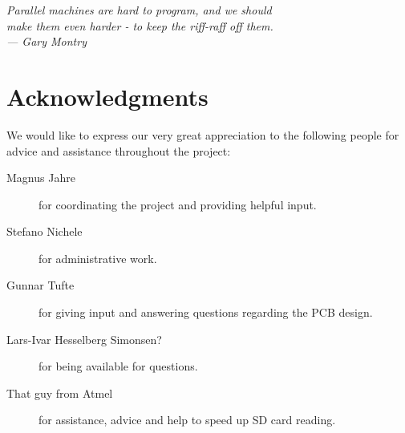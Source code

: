 
\begin{flushright}{\slshape
    Parallel machines are hard to program, and we should\\
    make them even harder - to keep the riff-raff off them.\\ \medskip
    ---  Gary Montry}  %
\end{flushright}

\bigskip

\begingroup
\let\clearpage\relax
\let\cleardoublepage\relax
\let\cleardoublepage\relax
\chapter*{Acknowledgments}
\bigskip

We would like to express our very great appreciation to the following people for
advice and assistance throughout the project:

\begin{description} %
\item[Magnus Jahre] for coordinating the project and providing helpful input.
\item[Stefano Nichele] for administrative work. 
\item[Gunnar Tufte] for giving input and answering questions regarding the PCB
design.
\item[Lars-Ivar Hesselberg Simonsen?] for being available for questions.
\item[That guy from Atmel] for assistance, advice and help to speed up SD
card reading.
\end{description}
\endgroup
